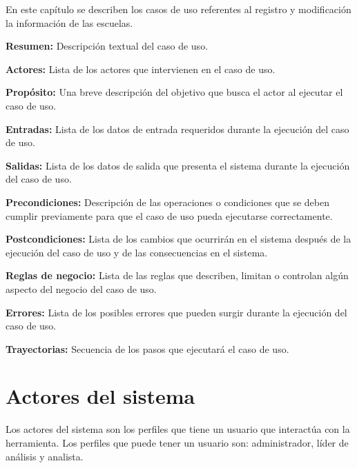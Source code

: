 En este capítulo se describen los casos de uso referentes al registro y modificación la información de las escuelas. \bigskip
     
    \begin{objetivos}
	\item {\bf Resumen:} Descripción textual del caso de uso.
	\item {\bf Actores:} Lista de los actores que intervienen en el caso de uso.
	\item {\bf Propósito:} Una breve descripción del objetivo que busca el actor al ejecutar el caso de uso.
	\item {\bf Entradas:} Lista de los datos de entrada requeridos durante la ejecución del caso de uso.
	\item {\bf Salidas:} Lista de los datos de salida que presenta el sistema durante la ejecución del caso de uso.
	\item {\bf Precondiciones:} Descripción de las operaciones o condiciones que se deben cumplir previamente para que el caso de uso pueda ejecutarse correctamente.
	\item {\bf Postcondiciones:} Lista de los cambios que ocurrirán en el sistema después de la ejecución del caso de uso y de las consecuencias en el sistema.
	\item {\bf Reglas de negocio:} Lista de las reglas que describen, limitan o controlan algún aspecto del negocio del caso de uso.
	\item {\bf Errores:} Lista de los posibles errores que pueden surgir durante la ejecución del caso de uso.
	\item {\bf Trayectorias:} Secuencia de los pasos que ejecutará el caso de uso.
    \end{objetivos}

\section{Actores del sistema}\label{sec:Comportamiento:ActoresSistema}
Los actores del sistema son los perfiles que tiene un usuario que interactúa con la herramienta. Los perfiles que puede tener un usuario
son: administrador, líder de análisis y analista.\\

